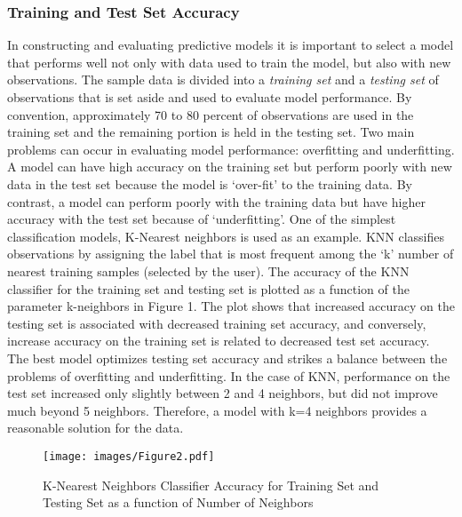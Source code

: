 \documentclass[sigconf]{acmart}
\begin{document}

\subsubsection{Training and Test Set Accuracy}

In constructing and evaluating predictive models it is important to select 
a model that performs well not only with data used to train the model, but 
also with new observations. The sample data is divided into a 
\emph{training set} and a \emph{testing set} of observations that is set aside 
and used to evaluate model performance. By convention, approximately 70 to 80 
percent of observations are used in the training set and the remaining 
portion is held in the testing set. Two main problems can occur in evaluating 
model performance: overfitting and underfitting. A model can have high accuracy 
on the training set but perform poorly with new data in the test set because 
the model is `over-fit' to the training data. By contrast, a model can perform 
poorly with the training data but have higher accuracy with the test set 
because of `underfitting'. One of the simplest classification models, 
K-Nearest neighbors is used as an example. KNN classifies observations by 
assigning the label that is most frequent among the `k' number of nearest 
training samples (selected by the user). The accuracy of the KNN classifier 
for the training set and testing set is plotted as a function of the parameter 
k-neighbors in Figure 1. The plot shows that increased accuracy on the testing 
set is associated with decreased training set accuracy, and conversely, 
increase accuracy on the training set is related to decreased test set accuracy. 
The best model optimizes testing set accuracy and strikes a balance between 
the problems of overfitting and underfitting. In the case of KNN, performance 
on the test set increased only slightly between 2 and 4 neighbors, but did not 
improve much beyond 5 neighbors. Therefore, a model with k=4 neighbors 
provides a reasonable solution for the data. 

\begin{figure}[!ht]
  \centering\texttt{[image: images/Figure2.pdf]}
  \caption{K-Nearest Neighbors Classifier Accuracy for Training Set and 
  Testing Set as a function of Number of Neighbors}
  \label{f:Figure2}
\end{figure}

\end{document}
